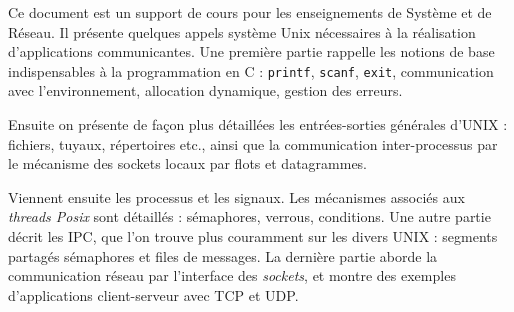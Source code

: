 Ce document est un support de cours pour les enseignements de Système
et de Réseau. Il présente quelques appels système Unix nécessaires à la
réalisation d'applications communicantes. Une première partie rappelle
les notions de base indispensables à la programmation en C :
\texttt{printf}, \texttt{scanf}, \texttt{exit}, communication avec
l'environnement, allocation dynamique, gestion des erreurs.

Ensuite on présente de façon plus détaillées les 
entrées-sorties générales d'UNIX : fichiers, tuyaux, répertoires etc.,
ainsi que la communication inter-processus par le mécanisme des
sockets locaux par flots et datagrammes.

Viennent ensuite les processus  et les signaux. Les mécanismes
associés aux \emph{threads  Posix} sont détaillés : sémaphores,
verrous, conditions. Une autre partie décrit les IPC, que l'on trouve
plus couramment sur les divers UNIX : segments partagés
sémaphores et files de messages. La dernière partie aborde
la communication réseau par l'interface des \emph{sockets},
et montre des exemples d'applications client-serveur avec TCP et UDP.
